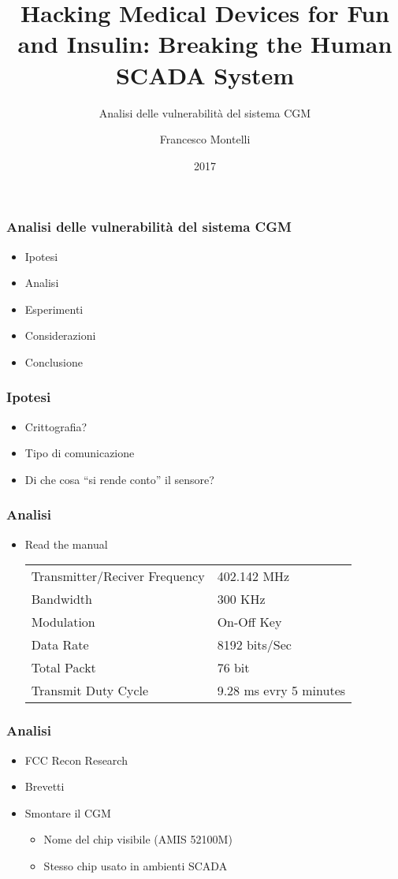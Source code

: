 \documentclass{beamer}
\title{Hacking Medical Devices for Fun and Insulin: Breaking the Human 
SCADA System}
\subtitle{Analisi delle vulnerabilità del sistema CGM}
\author{Francesco Montelli}
\institute{CeSeNa}
\date{2017}
\begin{document}
 
\frame{\titlepage}

\begin{frame}
	\frametitle{Analisi delle vulnerabilità del sistema CGM}
	\begin{itemize}
		\item Ipotesi
		\item Analisi
		\item Esperimenti
		\item Considerazioni
		\item Conclusione
	\end{itemize}
\end{frame}
 
\begin{frame}
\frametitle{Ipotesi}
	\begin{itemize}
		\item Crittografia?
		\item Tipo di comunicazione
		\item Di che cosa ``si rende conto'' il sensore?
	\end{itemize}
\end{frame}

\begin{frame}
\frametitle{Analisi}
	\begin{itemize}
		\item Read the manual
			\begin{table}
			\centering
			\begin{tabular}{ll}
				Transmitter/Reciver Frequency & 402.142 MHz            \\
				Bandwidth                     & 300 KHz                \\
				Modulation                    & On-Off Key             \\
				Data Rate                     & 8192 bits/Sec          \\
				Total Packt                   & 76 bit                 \\
				Transmit Duty Cycle           & 9.28 ms evry 5 minutes                           
			\end{tabular}
			\end{table}
	\end{itemize}
\end{frame}

\begin{frame}
\frametitle{Analisi}
	\begin{itemize}
		\item FCC Recon Research
		\item Brevetti
		\item Smontare il CGM
			\begin{itemize}
				\item Nome del chip visibile (AMIS 52100M)
				\item Stesso chip usato in ambienti SCADA
			\end{itemize}
	\end{itemize}
\end{frame}
\end{document}
